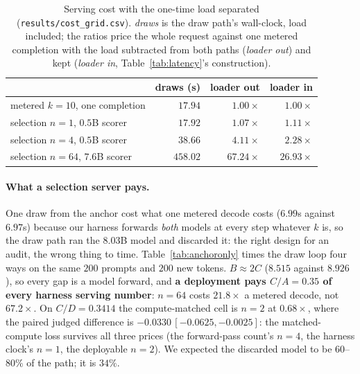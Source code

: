 \begin{table}[ht]
\centering\footnotesize
\caption{Serving cost with the one-time load separated (\texttt{results/\allowbreak cost\_\allowbreak grid.csv}). \emph{draws} is the draw path's wall-clock, load included; the ratios price the whole request
against one metered completion with the load subtracted from both paths (\emph{loader out}) and kept
(\emph{loader in}, Table~\ref{tab:latency}'s construction).}
\label{tab:costgrid}
\begin{tabular}{@{}lrrr@{}}
\toprule
& draws (s) & loader out & loader in \\
\midrule
metered $k=10$, one completion  & $17.94$ & $1.00\times$ & $1.00\times$ \\
selection $n=1$, $0.5$B scorer  & $17.92$ & $\mathbf{1.07\times}$ & $1.11\times$ \\
selection $n=4$, $0.5$B scorer  & $38.66$ & $4.11\times$ & $2.28\times$ \\
selection $n=64$, $7.6$B scorer & $458.02$ & $67.24\times$ & $26.93\times$ \\
\bottomrule
\end{tabular}
\end{table}

\paragraph{What a selection server pays.}\label{app:anchoronly}
One draw from the anchor cost what one metered decode costs ($6.99$s against $6.97$s) because our harness
forwards \emph{both} models at every step whatever $k$ is, so the draw path ran the $8.03$B model and
discarded it: the right design for an audit, the wrong thing to time. Table~\ref{tab:anchoronly} times the
draw loop four ways on the same $200$ prompts and $200$ new tokens. $B \approx 2C$ ($8.515$ against
$8.926$), so every gap is a model forward, and \textbf{a deployment pays $C/A = 0.35$ of every harness
serving number}: $n=64$ costs $21.8\times$ a metered decode, not $67.2\times$. On $C/D = 0.3414$ the
compute-matched cell is $n=2$ at $0.68\times$, where the paired judged difference is
$-0.0330\,[-0.0625,-0.0025]$: the matched-compute loss survives all three prices (the forward-pass count's
$n=4$, the harness clock's $n=1$, the deployable $n=2$). We expected the discarded model to be
$60$--$80\%$ of the path; it is $34\%$.

